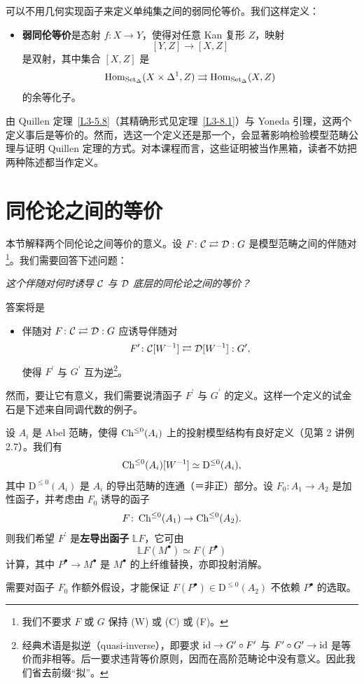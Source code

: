 \begin{remark}\label{L3-6.6}
可以不用几何实现函子来定义单纯集之间的弱同伦等价。我们这样定义：
\begin{itemize}[leftmargin=3.4em,itemsep=0.15em]
\item [(W)] \textbf{弱同伦等价}是态射 $f\colon X\to Y$，使得对任意 Kan 复形 $Z$，映射
\[
[Y,Z]\to[X,Z]
\]
是双射，其中集合 $[X,Z]$ 是
\[
\operatorname{Hom}_{\operatorname{Set}_{\Delta}}(X\times\Delta^{1},Z)\rightrightarrows\operatorname{Hom}_{\operatorname{Set}_{\Delta}}(X,Z)
\]
的余等化子。
\end{itemize}
由 Quillen 定理~\ref{L3-5.8}（其精确形式见定理~\ref{L3-8.1}）与 Yoneda 引理，这两个定义事后是等价的。然而，选这一个定义还是那一个，会显著影响检验模型范畴公理与证明 Quillen 定理的方式。对本课程而言，这些证明被当作黑箱，读者不妨把两种陈述都当作定义。
\end{remark}

\section{同伦论之间的等价}

\nitem\label{L3-7.1}
本节解释两个同伦论之间等价的意义。设 $F\colon\mathcal{C}\rightleftarrows\mathcal{D}:G$ 是模型范畴之间的伴随对\footnote{我们不要求 $F$ 或 $G$ 保持 (W) 或 (C) 或 (F)。}。我们需要回答下述问题：
\begin{center}
\emph{这个伴随对何时诱导 $\mathcal{C}$ 与 $\mathcal{D}$ 底层的同伦论之间的等价？}
\end{center}
答案将是
\begin{itemize}[leftmargin=2.2em,itemsep=0.1em]
\item 伴随对 $F\colon\mathcal{C}\rightleftarrows\mathcal{D}:G$ 应诱导伴随对
\[
F^{\prime}\colon\mathcal{C}[W^{-1}]\rightleftarrows\mathcal{D}[W^{-1}]:G^{\prime},
\]
使得 $F^{\prime}$ 与 $G^{\prime}$ 互为逆\footnote{经典术语是拟逆（quasi-inverse），即要求 $\operatorname{id}\to G^{\prime}\circ F^{\prime}$ 与 $F^{\prime}\circ G^{\prime}\to\operatorname{id}$ 是等价而非相等。后一要求违背等价原则，因而在高阶范畴论中没有意义。因此我们省去前缀“拟”。}。
\end{itemize}
然而，要让它有意义，我们需要说清函子 $F^{\prime}$ 与 $G^{\prime}$ 的定义。这样一个定义的试金石是下述来自同调代数的例子。

\begin{example}\label{L3-7.2}
设 $A_{i}$ 是 Abel 范畴，使得 $\operatorname{Ch}^{\le 0}(A_{i})$ 上的投射模型结构有良好定义（见第 2 讲例 2.7）。我们有
\[
\operatorname{Ch}^{\le 0}(A_{i})[W^{-1}]\simeq\mathrm{D}^{\le 0}(A_{i}),
\]
其中 $\mathrm{D}^{\le 0}(A_{i})$ 是 $A_{i}$ 的导出范畴的连通（＝非正）部分。设 $F_{0}\colon A_{1}\to A_{2}$ 是加性函子，并考虑由 $F_{0}$ 诱导的函子
\[
F\colon\operatorname{Ch}^{\le 0}(A_{1})\to\operatorname{Ch}^{\le 0}(A_{2}).
\]
则我们希望 $F^{\prime}$ 是\textbf{左导出函子} $\mathbb{L}F$，它可由
\[
\mathbb{L}F(M^{\bullet})\simeq F(P^{\bullet})
\]
计算，其中 $P^{\bullet}\to M^{\bullet}$ 是 $M^{\bullet}$ 的上纤维替换，亦即投射消解。

需要对函子 $F_{0}$ 作额外假设，才能保证 $F(P^{\bullet})\in\mathrm{D}^{\le 0}(A_{2})$ 不依赖 $P^{\bullet}$ 的选取。
\end{example}

